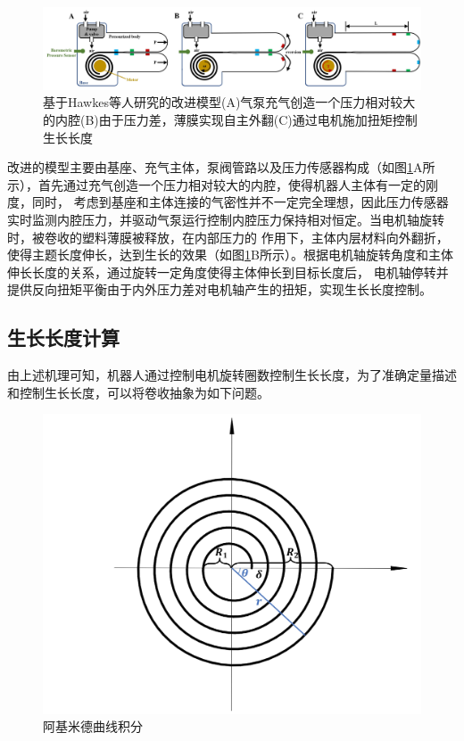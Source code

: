 \documentclass[11pt, a4paper, oneside]{ctexart}
\begin{document}
\begin{figure}[H]
    \centering
    \includegraphics[scale=0.18]{工作示意图}
    \caption{基于Hawkes等人研究的改进模型(A)气泵充气创造一个压力相对较大的内腔(B)由于压力差，薄膜实现自主外翻(C)通过电机施加扭矩控制生长长度}
    \label{工作示意图}
\end{figure}

改进的模型主要由基座、充气主体，泵阀管路以及压力传感器构成（如图\ref{工作示意图}A所示），首先通过充气创造一个压力相对较大的内腔，使得机器人主体有一定的刚度，同时，
考虑到基座和主体连接的气密性并不一定完全理想，因此压力传感器实时监测内腔压力，并驱动气泵运行控制内腔压力保持相对恒定。当电机轴旋转时，被卷收的塑料薄膜被释放，在内部压力的
作用下，主体内层材料向外翻折，使得主题长度伸长，达到生长的效果（如图\ref{工作示意图}B所示）。根据电机轴旋转角度和主体伸长长度的关系，通过旋转一定角度使得主体伸长到目标长度后，
电机轴停转并提供反向扭矩平衡由于内外压力差对电机轴产生的扭矩，实现生长长度控制。

\subsection{生长长度计算}
由上述机理可知，机器人通过控制电机旋转圈数控制生长长度，为了准确定量描述和控制生长长度，可以将卷收抽象为如下问题。

\begin{figure}[H]
    \centering
    \includegraphics[scale=0.2]{阿基米德曲线积分}
    \caption{阿基米德曲线积分}
    \label{阿基米德曲线积分}
\end{figure}
\end{document}
